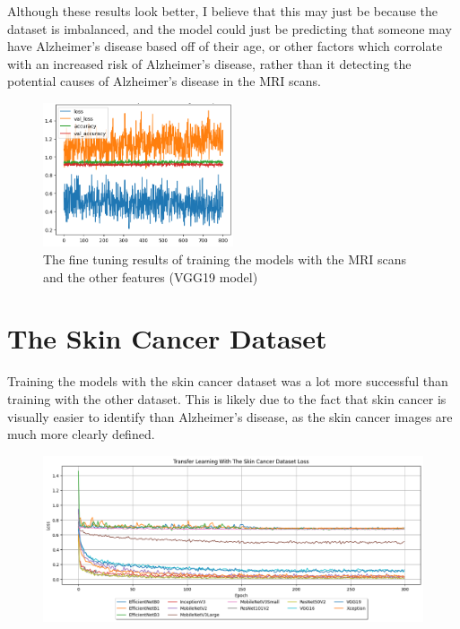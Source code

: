 \documentclass[]{final_report}
\begin{document}
Although these results look better, I believe that this may just be because the dataset is imbalanced, and the model could just be predicting that someone may have Alzheimer's disease based off of their age, or other factors which corrolate with an increased risk of Alzheimer's disease, rather than it detecting the potential causes of Alzheimer's disease in the MRI scans.

\begin{figure}[ht!]
  \centering
  \includegraphics[width=0.5\textwidth]{images/VGG19-OASIS-1-800-epoch.png}
  \caption{The fine tuning results of training the models with the MRI scans and the other features (VGG19 model)}
  \label{fig:VGG19-OASIS-1-800-epoch}
\end{figure}

\pagebreak
\section{The Skin Cancer Dataset}
Training the models with the skin cancer dataset was a lot more successful than training with the other dataset. This is likely due to the fact that skin cancer is visually easier to identify than Alzheimer's disease, as the skin cancer images are much more clearly defined.

\begin{figure}[ht!]
  \centering
  \includegraphics[width=1\textwidth]{images/skin-cancer-loss.png}
\end{figure}
\end{document}
